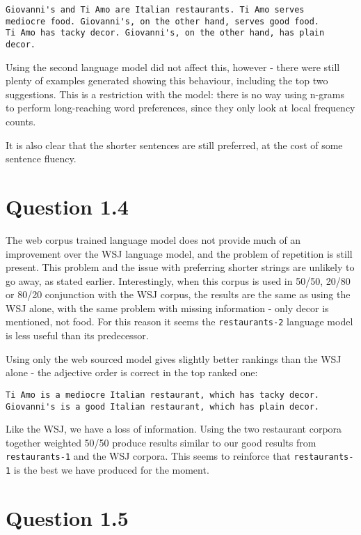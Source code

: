 \documentclass[a4paper,11pt,oneside]{article}
\begin{document}
\begin{verbatim}
Giovanni's and Ti Amo are Italian restaurants. Ti Amo serves
mediocre food. Giovanni's, on the other hand, serves good food.
Ti Amo has tacky decor. Giovanni's, on the other hand, has plain 
decor.
\end{verbatim}

Using the second language model did not affect this, however - there were still plenty of examples generated showing this behaviour, including the top two suggestions. This is a restriction with the model: there is no way using n-grams to perform long-reaching word preferences, since they only look at local frequency counts.

It is also clear that the shorter sentences are still preferred, at the cost of some sentence fluency.

\section{Question 1.4}
The web corpus trained language model does not provide much of an improvement over the WSJ language model, and the problem of repetition is still present. This problem and the issue with preferring shorter strings are unlikely to go away, as stated earlier. Interestingly, when this corpus is used in 50/50, 20/80 or 80/20 conjunction with the WSJ corpus, the results are the same as using the WSJ alone, with the same problem with missing information - only decor is mentioned, not food. For this reason it seems the \verb+restaurants-2+ language model is less useful than its predecessor.

Using only the web sourced model gives slightly better rankings than the WSJ alone - the adjective order is correct in the top ranked one:

\begin{verbatim}
Ti Amo is a mediocre Italian restaurant, which has tacky decor.
Giovanni's is a good Italian restaurant, which has plain decor.
\end{verbatim}

Like the WSJ, we have a loss of information. Using the two restaurant corpora together weighted 50/50 produce results similar to our good results from \verb+restaurants-1+ and the WSJ corpora. This seems to reinforce that \verb+restaurants-1+ is the best we have produced for the moment.

\section{Question 1.5}
\end{document}
